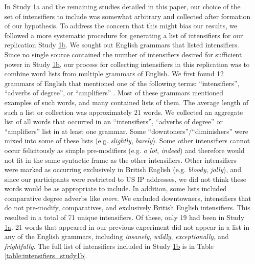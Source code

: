 \documentclass[10pt,letterpaper]{article}
\newcommand{\w}[1]{\emph{#1}}
\begin{document}
In Study  \hyperref[sec:study1a]{1a} and the remaining studies detailed in this paper, our choice of the set of intensifiers to include was somewhat arbitrary and collected after formation of our hypothesis.
To address the concern that this might bias our results, we followed a more systematic procedure for generating a list of intensifiers for our replication Study \hyperref[sec:study1b]{1b}.
We sought out English grammars that listed intensifiers.
Since no single source contained the number of intensifiers desired for sufficient power in Study \hyperref[sec:study1b]{1b}, our process for collecting intensifiers in this replication was to combine word lists from multiple grammars of English.
We first found 12 grammars of English that mentioned one of the following terms: ``intensifiers'', ``adverbs of degree'', or ``amplifiers'' \cite{aarts_oxford_2014,douglas_longman_2000,declerck_comprehensive_1991,garner_chicago_2016,givon_english_1993,greenbaum_oxford_1996,huddleston_cambridge_2002,huddleston_introduction_1984,nelson_english:_2010,quirk_grammar_1972,quirk_students_1990,van_gelderen_introduction_2010}.
Most of these grammars mentioned examples of such words, and many contained lists of them.
The average length of such a list or collection was approximately 21 words.
We collected an aggregate list of all words that occurred in an ``intensifiers'', ``adverbs of degree'' or ``amplifiers'' list in at least one grammar.
Some ``downtoners''/``diminishers'' were mixed into some of these lists (e.g. \w{slightly}, \w{barely}).
Some other intensifiers cannot occur felicitously as simple pre-modifiers (e.g. \w{a lot}, \w{indeed}) and therefore would not fit in the same syntactic frame as the other intensifiers.
Other intensifiers were marked as occurring exclusively in British English (e.g. \w{bloody}, \w{jolly}), and since our participants were restricted to US IP addresses, we did not think these words would be as appropriate to include.
In addition, some lists included comparative degree adverbs like \w{more}.
We excluded downtowners, intensifiers that do not pre-modify, comparatives, and exclusively British English intensifiers.
This resulted in a total of 71 unique intensifiers.
Of these, only 19 had been in Study \hyperref[sec:study1a]{1a}.
21 words that appeared in our previous experiment did not appear in a list in any of the English grammars, including \w{insanely}, \w{wildly}, \w{exceptionally}, and \w{frightfully}.
The full list of intensifiers included in Study \hyperref[sec:study1b]{1b} is in Table \hyperref[table:intensifiers_study1a]{\ref{table:intensifiers_study1b}}.
\end{document}
